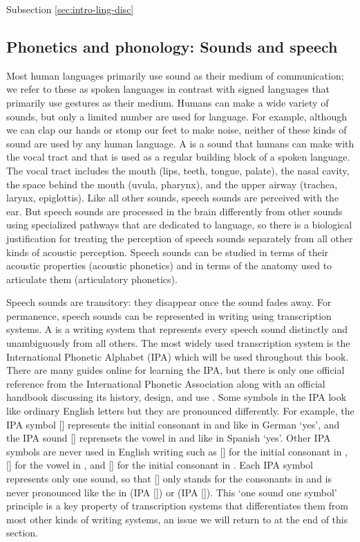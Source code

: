 Subsection \ref{sec:intro-ling-disc}

\subsection{Phonetics and phonology: Sounds and speech}\label{sec:intro-ling-phon}

Most human languages primarily use sound as their medium of communication; we refer to these as spoken languages in contrast with signed languages that primarily use gestures as their medium. Humans can make a wide variety of sounds, but only a limited number are used for language. For example, although we can clap our hands or stomp our feet to make noise, neither of these kinds of sound are used by any human language. A  is a sound that humans can make with the vocal tract and that is used as a regular building block of a spoken language. The vocal tract includes the mouth (lips, teeth, tongue, palate), the nasal cavity, the space behind the mouth (uvula, pharynx), and the upper airway (trachea, larynx, epiglottis). Like all other sounds, speech sounds are perceived with the ear. But speech sounds are processed in the brain differently from other sounds using specialized pathways that are dedicated to language, so there is a biological justification for treating the perception of speech sounds separately from all other kinds of acoustic perception. Speech sounds can be studied in terms of their acoustic properties (acoustic phonetics) and in terms of the anatomy used to articulate them (articulatory phonetics).

Speech sounds are transitory: they disappear once the sound fades away. For permanence, speech sounds can be represented in writing using transcription systems. A  is a writing system that represents every speech sound distinctly and unambiguously from all others. The most widely used transcription system is the International Phonetic Alphabet (IPA) which will be used throughout this book. There are many guides online for learning the IPA, but there is only one official reference from the International Phonetic Association \parencite{international-phonetic-association:2018} along with an official handbook discussing its history, design, and use \parencite{international-phonetic-association:1999}. Some symbols in the IPA look like ordinary English letters but they are pronounced differently. For example, the IPA symbol [] represents the initial consonant in  and  like in German  ‘yes’, and the IPA sound [] reprensets the vowel in  and  like in Spanish  ‘yes’. Other IPA symbols are never used in English writing such as [] for the initial consonant in , [] for the vowel in , and [] for the initial consonant in . Each IPA symbol represents only one sound, so that [] only stands for the consonants in  and is never pronounced like the  in  (IPA []) or  (IPA []). This ‘one sound one symbol’ principle is a key property of transcription systems that differentiates them from most other kinds of writing systems, an issue we will return to at the end of this section.

